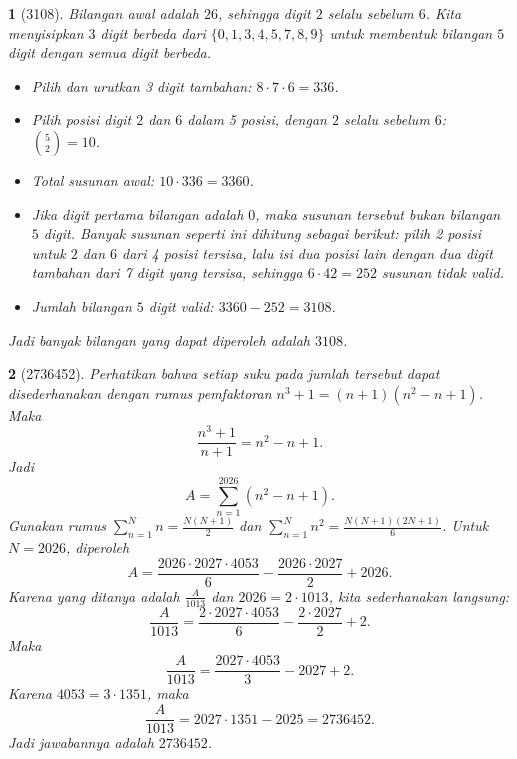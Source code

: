 \documentclass[11pt,a4paper,DIV=12]{scrartcl}
\theoremstyle{problemstyle}
\theoremstyle{answerstyle}
\newtheorem{answer}{}
\begin{document}
\begin{answer}[3108]
  Bilangan awal adalah $26$, sehingga digit $2$ selalu sebelum $6$. Kita menyisipkan $3$ digit berbeda dari $\{0,1,3,4,5,7,8,9\}$ untuk membentuk bilangan $5$ digit dengan semua digit berbeda.
  \begin{itemize}
    \item Pilih dan urutkan 3 digit tambahan: $8\cdot 7\cdot 6 = 336$.
    \item Pilih posisi digit $2$ dan $6$ dalam 5 posisi, dengan $2$ selalu sebelum $6$: $\binom{5}{2} = 10$.
    \item Total susunan awal: $10 \cdot 336 = 3360$.
    \item Jika digit pertama bilangan adalah $0$, maka susunan tersebut bukan bilangan $5$ digit. Banyak susunan seperti ini dihitung sebagai berikut: pilih 2 posisi untuk $2$ dan $6$ dari 4 posisi tersisa, lalu isi dua posisi lain dengan dua digit tambahan dari 7 digit yang tersisa, sehingga $6\cdot 42 = 252$ susunan tidak valid.
    \item Jumlah bilangan $5$ digit valid: $3360 - 252 = 3108$.
  \end{itemize}
  Jadi banyak bilangan yang dapat diperoleh adalah $\boxed{3108}$.
\end{answer}

\begin{answer}[2736452]
  Perhatikan bahwa setiap suku pada jumlah tersebut dapat disederhanakan dengan rumus pemfaktoran $n^3+1=(n+1)(n^2-n+1)$. Maka
  \[
    \frac{n^3+1}{n+1}=n^2-n+1.
  \]
  Jadi
  \[
    A=\sum_{n=1}^{2026}(n^2-n+1).
  \]
  Gunakan rumus $\sum_{n=1}^{N} n=\frac{N(N+1)}{2}$ dan $\sum_{n=1}^{N} n^2=\frac{N(N+1)(2N+1)}{6}$. Untuk $N=2026$, diperoleh
  \[
    A=\frac{2026\cdot 2027\cdot 4053}{6}-\frac{2026\cdot 2027}{2}+2026.
  \]
  Karena yang ditanya adalah $\frac{A}{1013}$ dan $2026=2\cdot 1013$, kita sederhanakan langsung:
  \[
    \frac{A}{1013}
    =\frac{2\cdot 2027\cdot 4053}{6}-\frac{2\cdot 2027}{2}+2.
  \]
  Maka
  \[
    \frac{A}{1013}
    =\frac{2027\cdot 4053}{3}-2027+2.
  \]
  Karena $4053=3\cdot 1351$, maka
  \[
    \frac{A}{1013}=2027\cdot 1351-2025=2736452.
  \]
  Jadi jawabannya adalah $\boxed{2736452}$.
\end{answer}
\end{document}
